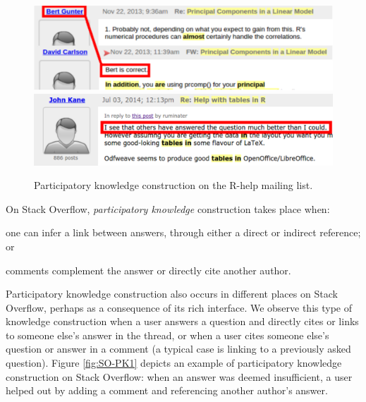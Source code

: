 \documentclass[smallextended]{svjour3}       %
\newcommand{\SO}{Stack Overflow\xspace}
\newcommand{\RH}{R-help\xspace}
\begin{document}
    
    \begin{figure}[!htb]
        \centering
        \includegraphics[width=\columnwidth]{../Figures/ML-PKimg2}
        \includegraphics[width=\columnwidth]{../Figures/ML-PKimg11}
        \caption[Participatory knowledge construction on the \RH mailing list.]{Participatory knowledge construction on the \RH mailing list.}
        \label{fig:ML-PK1}
          \end{figure}

On \SO, \textit{participatory knowledge} construction takes place when:
    \begin{enumerate*}[label=(\arabic*)]
    \item one can infer a link between answers, through either a direct or indirect reference; or
    \item comments complement the answer or directly cite another author.
    \end{enumerate*}
Participatory knowledge construction also occurs in different places on \SO, perhaps as a consequence of its rich interface. We observe this type of knowledge construction when a user answers a question and directly cites or links to someone else's answer in the thread, or when a user cites someone else's question or answer in a comment (a typical case is linking to a previously asked question). Figure \ref{fig:SO-PK1} depicts an example of participatory knowledge construction on \SO: when an answer was deemed insufficient, a user helped out by adding a comment and referencing another author's answer.
\end{document}
